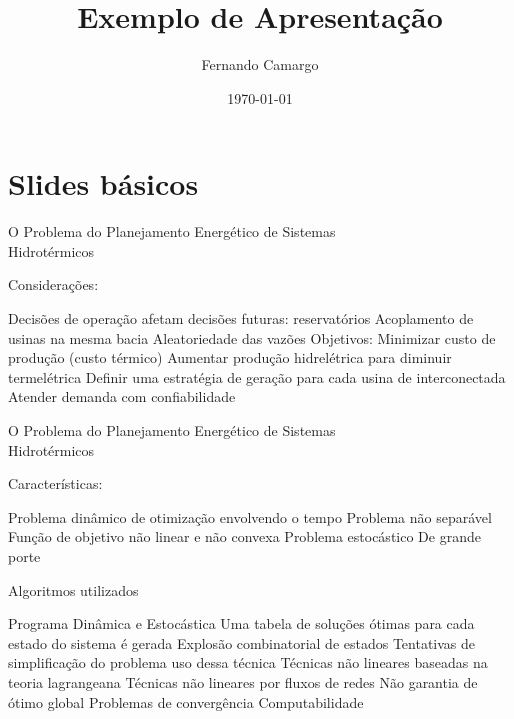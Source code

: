 \documentclass{beamer}
\title{Exemplo de Apresentação}
\date{\today}
\author{Fernando Camargo}
\institute{ZG Soluções}
\begin{document}
\maketitle

\section{Slides básicos}

\begin{frame}{O Problema do Planejamento Energético de Sistemas\\Hidrotérmicos}
  
  Considerações:
  \begin{outline}
     Decisões de operação afetam decisões futuras: reservatórios
     Acoplamento de usinas na mesma bacia
     Aleatoriedade das vazões
     Objetivos:
       Minimizar custo de produção (custo térmico)
       Aumentar produção hidrelétrica para diminuir termelétrica
       Definir uma estratégia de geração para cada usina de interconectada
       Atender demanda com confiabilidade
  \end{outline}
\end{frame}

\begin{frame}{O Problema do Planejamento Energético de Sistemas\\Hidrotérmicos}
  
  Características:
  \begin{outline}
     Problema dinâmico de otimização envolvendo o tempo
     Problema não separável
     Função de objetivo não linear e não convexa
     Problema estocástico
     De grande porte
  \end{outline}
\end{frame}

\begin{frame}{Algoritmos utilizados}
  
  \begin{outline}
  \0 
     Programa Dinâmica e Estocástica
      \2 Uma tabela de soluções ótimas para cada estado do sistema é gerada
      \2 Explosão combinatorial de estados
      \2 Tentativas de simplificação do problema uso dessa técnica
     Técnicas não lineares baseadas na teoria lagrangeana
     Técnicas não lineares por fluxos de redes
  \0 
     Não garantia de ótimo global
     Problemas de convergência 
     Computabilidade
  \end{outline}
\end{frame}
\end{document}
